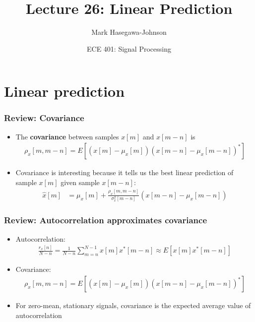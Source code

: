 \documentclass{beamer}
\title{Lecture 26: Linear Prediction}
\author{Mark Hasegawa-Johnson}
\date{ECE 401: Signal Processing}
\begin{document}
\begin{frame}
  \maketitle
\end{frame}

\begin{frame}
  \tableofcontents
\end{frame}


\section[LPC]{Linear prediction}

\begin{frame}
  \frametitle{Review: Covariance}

  \begin{itemize}
  \item The \textbf{covariance} between samples $x[m]$ and $x[m-n]$ is
    \begin{align*}
      \rho_x[m,m-n]  = E\left[(x[m]-\mu_x[m])(x[m-n]-\mu_x[m-n])^*\right]
    \end{align*}
  \item Covariance is interesting because it tells us the best linear prediction
    of sample $x[m]$ given sample $x[m-n]$:
    \begin{align*}
      \hat{x}[m] &= \mu_x[m] + \frac{\rho_x[m,m-n]}{\sigma^2_x[m-n]}
      \left(x[m-n]-\mu_x[m-n]\right)
    \end{align*}
  \end{itemize}
\end{frame}

\begin{frame}
  \frametitle{Review: Autocorrelation approximates covariance}

  \begin{itemize}
  \item Autocorrelation:
  \begin{align*}
    \frac{r_x[n]}{N-n} =\frac{1}{N-n}\sum_{m=n}^{N-1} x[m]x^*[m-n] \approx E\left[x[m]x^*[m-n]\right]
  \end{align*}
  \item Covariance:
    \begin{align*}
      \rho_x[m,m-n]  = E\left[(x[m]-\mu_x[m])(x[m-n]-\mu_x[m-n])^*\right]
    \end{align*}
  \item For zero-mean, stationary signals, covariance is the expected average value of
    autocorrelation
  \end{itemize}
\end{frame}
\end{document}
